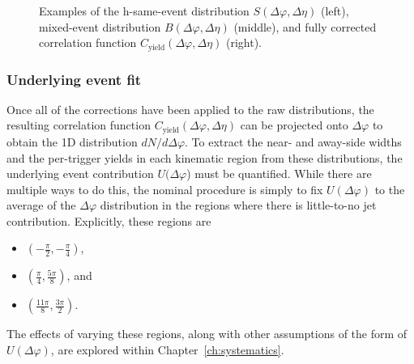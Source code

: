 \begin{figure}[t]
\caption{Examples of the h-\lmb same-event distribution $S(\Delta\varphi, \Delta\eta)$ (left), mixed-event distribution $B(\Delta\varphi, \Delta\eta)$ (middle), and fully corrected correlation function $C_{\text{yield}}(\Delta\varphi, \Delta\eta)$ (right).}
\label{fig:twod_cor}
\end{figure}

\subsubsection{Underlying event fit}
\label{sec:uefit}

Once all of the corrections have been applied to the raw distributions, the resulting correlation function $C_{\text{yield}}(\Delta\varphi, \Delta\eta)$ can be projected onto $\Delta\varphi$ to obtain the 1D distribution $dN/d\Delta\varphi$. To extract the near- and away-side widths and the per-trigger yields in each kinematic region from these distributions, the underlying event contribution $U(\Delta\varphi$) must be quantified. While there are multiple ways to do this, the nominal procedure is simply to fix $U(\Delta\varphi)$ to the average of the $\Delta\varphi$ distribution in the regions where there is little-to-no jet contribution. Explicitly, these regions are 
\begin{itemize}
\item $(-\frac{\pi}{2}, -\frac{\pi}{4})$, 
\item $(\frac{\pi}{4}, \frac{5\pi}{8})$, and
\item $(\frac{11\pi}{8}, \frac{3\pi}{2})$. 
\end{itemize}
The effects of varying these regions, along with other assumptions of the form of $U(\Delta\varphi)$, are explored within Chapter~\ref{ch:systematics}.

